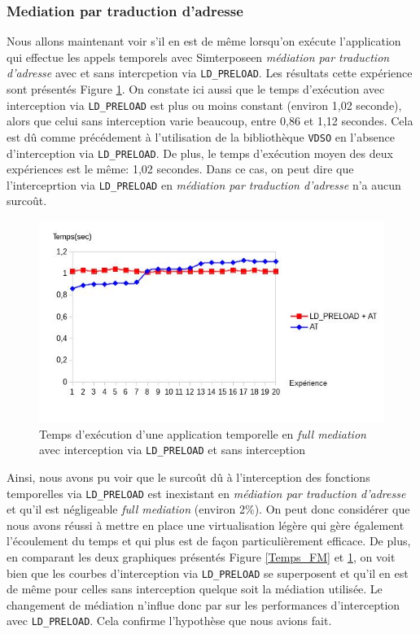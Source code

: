 \subsubsection{Mediation par traduction d'adresse}
Nous allons maintenant voir s'il en est de même  lorsqu'on exécute l'application qui effectue les appels temporels avec Simterposeen \textit{médiation par traduction d'adresse} avec et sans intercpetion via \texttt{LD\_PRELOAD}. Les résultats cette expérience sont présentés Figure \ref{Temps_AT}. On constate ici aussi que le temps d'exécution avec interception via \texttt{LD\_PRELOAD} est plus ou moins constant (environ 1,02 seconde), alors que celui sans interception varie beaucoup, entre 0,86 et 1,12 secondes. Cela est dû comme précédement à l'utilisation de la bibliothèque \texttt{VDSO} en l'absence d'interception via \texttt{LD\_PRELOAD}. De plus, le temps d'exécution moyen des deux expériences est le même: 1,02 secondes. Dans ce cas, on peut dire que l'interceprtion via \texttt{LD\_PRELOAD} en \textit{médiation par traduction d'adresse} n'a aucun surcoût.

\begin{figure}
  \centering
    \includegraphics[scale=0.65]{mesures/graph/Temps_AT.jpg}
    \caption{Temps d'exécution d'une application temporelle en \textit{full mediation} avec interception via \texttt{LD\_PRELOAD} et sans interception}
    \label{Temps_AT}
\end{figure}


Ainsi, nous avons pu voir que le surcoût dû à l'interception des fonctions temporelles via \texttt{LD\_PRELOAD} est inexistant en \textit{médiation par traduction d'adresse} et qu'il est négligeable \textit{full mediation} (environ 2\%). On peut donc considérer que nous avons réussi à mettre en place une virtualisation légère qui gère également l'écoulement du temps et qui plus est de façon particulièrement efficace. De plus, en comparant les deux graphiques présentés Figure \ref{Temps_FM} et \ref{Temps_AT}, on voit bien que les courbes d'interception via \texttt{LD\_PRELOAD} se superposent et qu'il en est de même pour celles sans interception quelque soit la médiation utilisée. Le changement de médiation n'influe donc par sur les performances d'interception avec \texttt{LD\_PRELOAD}. Cela confirme l'hypothèse que nous avions fait.

\vspace{0.5cm}
